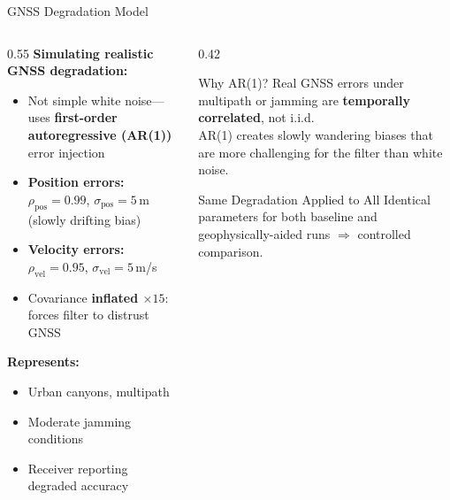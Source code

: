 \documentclass[aspectratio=169]{beamer}
\begin{document}
\begin{frame}{GNSS Degradation Model}
    \begin{columns}
        \begin{column}{0.55\textwidth}
            \textbf{Simulating realistic GNSS degradation:}
            \begin{itemize}
                \item Not simple white noise---uses \textbf{first-order autoregressive (AR(1))} error injection
                \item \textbf{Position errors:} $\rho_\text{pos} = 0.99$, $\sigma_\text{pos} = 5$\,m (slowly drifting bias)
                \item \textbf{Velocity errors:} $\rho_\text{vel} = 0.95$, $\sigma_\text{vel} = 5$\,m/s
                \item Covariance \textbf{inflated $\times 15$}: forces filter to distrust GNSS
            \end{itemize}
            \vspace{0.5em}
            \textbf{Represents:}
            \begin{itemize}
                \item Urban canyons, multipath
                \item Moderate jamming conditions
                \item Receiver reporting degraded accuracy
            \end{itemize}
        \end{column}
        \begin{column}{0.42\textwidth}
            \begin{alertblock}{Why AR(1)?}
                \small
                Real GNSS errors under multipath or jamming are \textbf{temporally correlated}, not i.i.d.\\[0.4em]
                AR(1) creates slowly wandering biases that are more challenging for the filter than white noise.
            \end{alertblock}
            \vspace{0.5em}
            \begin{block}{Same Degradation Applied to All}
                \small
                Identical parameters for both baseline and geophysically-aided runs $\Rightarrow$ controlled comparison.
            \end{block}
        \end{column}
    \end{columns}
\end{frame}
\end{document}
